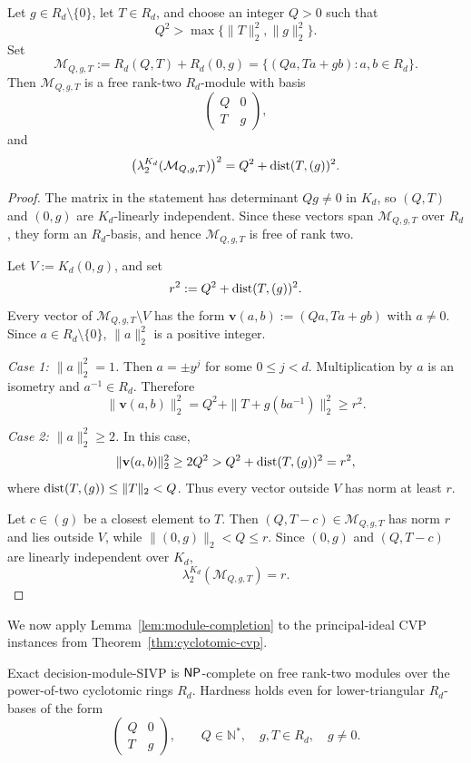 \begin{lemma}
\label{lem:module-completion}
Let \(g\in R_d\setminus\{0\}\), let \(T\in R_d\), and choose an integer
\(Q>0\) such that
\[
 Q^2>\max\{\|T\|_2^2,\|g\|_2^2\}.
\]
Set
\[
 \mathcal M_{Q,g,T}
 :=R_d(Q,T)+R_d(0,g)
 =\{(Qa,Ta+gb):a,b\in R_d\}.
\]
Then \(\mathcal M_{Q,g,T}\) is a free rank-two \(R_d\)-module
with {basis}
\[
 \begin{pmatrix}
  Q&0\\
  T&g
 \end{pmatrix},
\]
and
\[
 \bigl(\lambda_2^{K_d}(\mathcal M_{Q,g,T})\bigr)^2
 =Q^2+\operatorname{dist}(T,(g))^2.
\]
\end{lemma}

\begin{proof}
The matrix in the statement has determinant \(Qg\neq0\) in
\(K_d\), so \((Q,T)\) and \((0,g)\) are \(K_d\)-linearly independent.
Since these vectors span \(\mathcal M_{Q,g,T}\) over \(R_d\), they form an
\(R_d\)-basis, and hence \(\mathcal M_{Q,g,T}\) is free of rank two.

Let \(V:=K_d(0,g)\), and set
\[
 r^2:=Q^2+\operatorname{dist}(T,(g))^2.
\]
Every vector of \(\mathcal M_{Q,g,T}\setminus V\) has the form
\(\mathbf v(a,b):=(Qa,Ta+gb)\) with \(a\neq0\).
Since \(a\in R_d\setminus\{0\}\), \(\|a\|_2^2\) is a positive integer.

\textit{Case 1: \(\|a\|_2^2=1\).}
Then \(a=\pm y^j\) for some \(0\leq j<d\).  Multiplication by \(a\) is an
isometry and \(a^{-1}\in R_d\).  Therefore
\[
 \|\mathbf v(a,b)\|_2^2
 =Q^2+\|T+g(ba^{-1})\|_2^2
 \geq r^2.
\]

\textit{Case 2: \(\|a\|_2^2\geq2\).}
In this case,
\[
 \|\mathbf v(a,b)\|_2^2
 \geq2Q^2
 >Q^2+\operatorname{dist}(T,(g))^2
 =r^2,
\]
where \(\operatorname{dist}(T,(g))\leq\|T\|_2<Q\).  Thus every vector outside \(V\) has
norm at least \(r\).

Let \(c\in(g)\) be a closest element to \(T\).  Then
\((Q,T-c)\in\mathcal M_{Q,g,T}\) has norm \(r\) and lies outside \(V\), while
\(\|(0,g)\|_2<Q\leq r\).  Since \((0,g)\) and \((Q,T-c)\) are linearly
independent over \(K_d\),
\[
 \lambda_2^{K_d}(\mathcal M_{Q,g,T})=r.
\]
\end{proof}

We now apply Lemma~\ref{lem:module-completion} to the
principal-ideal CVP instances from Theorem~\ref{thm:cyclotomic-cvp}.

\begin{theorem}
\label{thm:module-sivp}
Exact decision-module-SIVP is \(\mathsf{NP}\)-complete on free rank-two modules over
the power-of-two cyclotomic rings \(R_d\).
Hardness holds even for lower-triangular \(R_d\)-bases of the form
\[
 \begin{pmatrix}
  Q&0\\
  T&g
 \end{pmatrix},
 \qquad
 Q\in\mathbb{N}^*,\quad g,T\in R_d,\quad g\neq0.
\]
\end{theorem}

